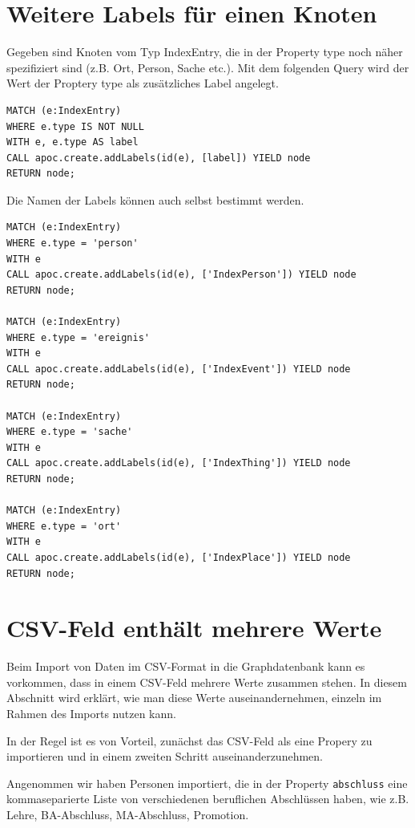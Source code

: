 \documentclass[ngerman,]{scrreprt}
\begin{document}
\section{Weitere Labels für einen Knoten}\label{weitere-labels-fuxfcr-einen-knoten}

Gegeben sind Knoten vom Typ IndexEntry, die in der Property type noch näher spezifiziert sind (z.B. Ort, Person, Sache etc.). Mit dem folgenden Query wird der Wert der Proptery type als zusätzliches Label angelegt.

\begin{verbatim}
MATCH (e:IndexEntry)
WHERE e.type IS NOT NULL
WITH e, e.type AS label
CALL apoc.create.addLabels(id(e), [label]) YIELD node
RETURN node;
\end{verbatim}

Die Namen der Labels können auch selbst bestimmt werden.

\begin{verbatim}
MATCH (e:IndexEntry)
WHERE e.type = 'person'
WITH e
CALL apoc.create.addLabels(id(e), ['IndexPerson']) YIELD node
RETURN node;

MATCH (e:IndexEntry)
WHERE e.type = 'ereignis'
WITH e
CALL apoc.create.addLabels(id(e), ['IndexEvent']) YIELD node
RETURN node;

MATCH (e:IndexEntry)
WHERE e.type = 'sache'
WITH e
CALL apoc.create.addLabels(id(e), ['IndexThing']) YIELD node
RETURN node;

MATCH (e:IndexEntry)
WHERE e.type = 'ort'
WITH e
CALL apoc.create.addLabels(id(e), ['IndexPlace']) YIELD node
RETURN node;
\end{verbatim}

\section{CSV-Feld enthält mehrere Werte}\label{csv-feld-enthuxe4lt-mehrere-werte}

Beim Import von Daten im CSV-Format in die Graphdatenbank kann es vorkommen, dass in einem CSV-Feld mehrere Werte zusammen stehen. In diesem Abschnitt wird erklärt, wie man diese Werte auseinandernehmen, einzeln im Rahmen des Imports nutzen kann.

In der Regel ist es von Vorteil, zunächst das CSV-Feld als eine Propery zu importieren und in einem zweiten Schritt auseinanderzunehmen.

Angenommen wir haben Personen importiert, die in der Property \texttt{abschluss} eine kommaseparierte Liste von verschiedenen beruflichen Abschlüssen haben, wie z.B. Lehre, BA-Abschluss, MA-Abschluss, Promotion.
\end{document}

